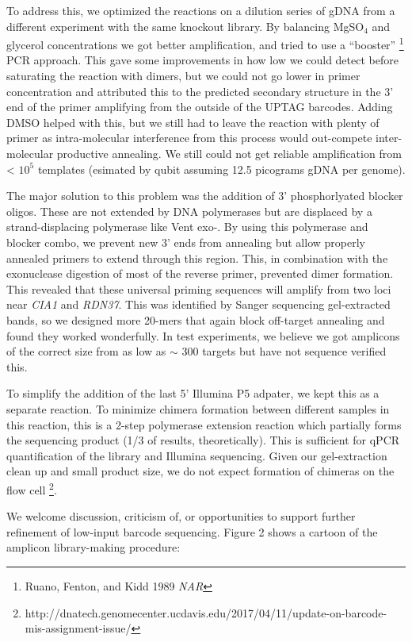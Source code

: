 {To address this, we optimized the reactions on a dilution series of gDNA
from a different experiment with the same knockout library. By balancing
MgSO\(_4\) and glycerol concentrations we got better amplification, and
tried to use a ``booster'' \footnote{Ruano, Fenton, and Kidd 1989
  \emph{NAR}} PCR approach. This gave some improvements in how low we
could detect before saturating the reaction with dimers, but we could
not go lower in primer concentration and attributed this to the
predicted secondary structure in the 3' end of the primer amplifying
from the outside of the UPTAG barcodes. Adding DMSO helped with this,
but we still had to leave the reaction with plenty of primer as
intra-molecular interference from this process would out-compete
inter-molecular productive annealing. We still could not get reliable
amplification from \textless{} \(10^5\) templates (esimated by qubit
assuming 12.5 picograms gDNA per genome).

The major solution to this problem was the addition of 3' phosphorlyated
blocker oligos. These are not extended by DNA polymerases but are
displaced by a strand-displacing polymerase like Vent exo-. By using
this polymerase and blocker combo, we prevent new 3' ends from annealing
but allow properly annealed primers to extend through this region. This,
in combination with the exonuclease digestion of most of the reverse
primer, prevented dimer formation. This revealed that these universal
priming sequences will amplify from two loci near \emph{CIA1} and
\emph{RDN37}. This was identified by Sanger sequencing gel-extracted
bands, so we designed more 20-mers that again block off-target annealing
and found they worked wonderfully. In test experiments, we believe we
got amplicons of the correct size from as low as \(\sim\) 300 targets
but have not sequence verified this.

To simplify the addition of the last 5' Illumina P5 adpater, we kept
this as a separate reaction. To minimize chimera formation between
different samples in this reaction, this is a 2-step polymerase
extension reaction which partially forms the sequencing product (1/3 of
results, theoretically). This is sufficient for qPCR quantification of
the library and Illumina sequencing. Given our gel-extraction clean up
and small product size, we do not expect formation of chimeras on the
flow cell \footnote{http://dnatech.genomecenter.ucdavis.edu/2017/04/11/update-on-barcode-mis-assignment-issue/}.

We welcome discussion, criticism of, or opportunities to support further
refinement of low-input barcode sequencing. Figure 2 shows a cartoon of
the amplicon library-making procedure:

}
